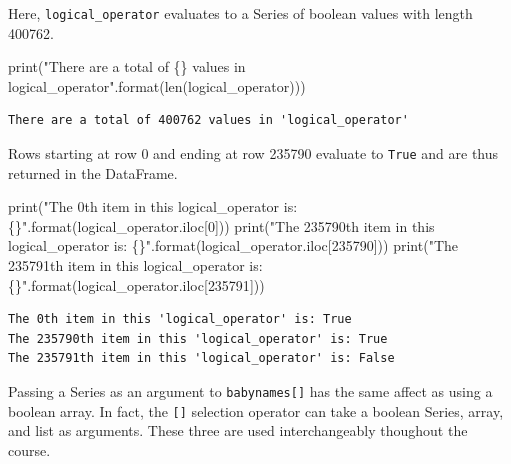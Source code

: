 \documentclass[
  letterpaper,
  DIV=11,
  numbers=noendperiod]{scrreprt}
\newenvironment{Shaded}{\begin{snugshade}}{\end{snugshade}}
\newcommand{\BuiltInTok}[1]{\textcolor[rgb]{0.00,0.23,0.31}{#1}}
\newcommand{\DecValTok}[1]{\textcolor[rgb]{0.68,0.00,0.00}{#1}}
\newcommand{\NormalTok}[1]{\textcolor[rgb]{0.00,0.23,0.31}{#1}}
\newcommand{\SpecialCharTok}[1]{\textcolor[rgb]{0.37,0.37,0.37}{#1}}
\newcommand{\StringTok}[1]{\textcolor[rgb]{0.13,0.47,0.30}{#1}}
\begin{document}
Here, \texttt{logical\_operator} evaluates to a Series of boolean values
with length 400762.

\begin{Shaded}
\begin{Highlighting}[]
\BuiltInTok{print}\NormalTok{(}\StringTok{"There are a total of }\SpecialCharTok{\{\}}\StringTok{ values in \textquotesingle{}logical\_operator\textquotesingle{}"}\NormalTok{.}\BuiltInTok{format}\NormalTok{(}\BuiltInTok{len}\NormalTok{(logical\_operator)))}
\end{Highlighting}
\end{Shaded}

\begin{verbatim}
There are a total of 400762 values in 'logical_operator'
\end{verbatim}

Rows starting at row 0 and ending at row 235790 evaluate to
\texttt{True} and are thus returned in the DataFrame.

\begin{Shaded}
\begin{Highlighting}[]
\BuiltInTok{print}\NormalTok{(}\StringTok{"The 0th item in this \textquotesingle{}logical\_operator\textquotesingle{} is: }\SpecialCharTok{\{\}}\StringTok{"}\NormalTok{.}\BuiltInTok{format}\NormalTok{(logical\_operator.iloc[}\DecValTok{0}\NormalTok{]))}
\BuiltInTok{print}\NormalTok{(}\StringTok{"The 235790th item in this \textquotesingle{}logical\_operator\textquotesingle{} is: }\SpecialCharTok{\{\}}\StringTok{"}\NormalTok{.}\BuiltInTok{format}\NormalTok{(logical\_operator.iloc[}\DecValTok{235790}\NormalTok{]))}
\BuiltInTok{print}\NormalTok{(}\StringTok{"The 235791th item in this \textquotesingle{}logical\_operator\textquotesingle{} is: }\SpecialCharTok{\{\}}\StringTok{"}\NormalTok{.}\BuiltInTok{format}\NormalTok{(logical\_operator.iloc[}\DecValTok{235791}\NormalTok{]))}
\end{Highlighting}
\end{Shaded}

\begin{verbatim}
The 0th item in this 'logical_operator' is: True
The 235790th item in this 'logical_operator' is: True
The 235791th item in this 'logical_operator' is: False
\end{verbatim}

Passing a Series as an argument to \texttt{babynames{[}{]}} has the same
affect as using a boolean array. In fact, the \texttt{{[}{]}} selection
operator can take a boolean Series, array, and list as arguments. These
three are used interchangeably thoughout the course.
\end{document}
